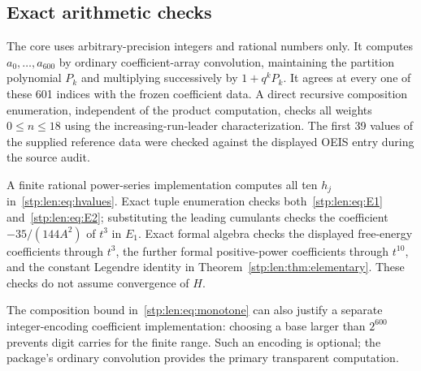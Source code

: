 \documentclass[11pt]{article}
\theoremstyle{remark}\newtheorem{remark}[theorem]{Remark}
\begin{document}
\subsection{Exact arithmetic checks}
The core uses arbitrary-precision integers and rational numbers only. It computes $a_0,\ldots,a_{600}$ by ordinary coefficient-array convolution, maintaining the partition polynomial $P_k$ and multiplying successively by $1+q^kP_k$. It agrees at every one of these 601 indices with the frozen coefficient data. A direct recursive composition enumeration, independent of the product computation, checks all weights $0\le n\le18$ using the increasing-run-leader characterization. The first 39 values of the supplied reference data were checked against the displayed OEIS entry during the source audit.

A finite rational power-series implementation computes all ten $h_j$ in~\eqref{stp:len:eq:hvalues}. Exact tuple enumeration checks both~\eqref{stp:len:eq:E1} and~\eqref{stp:len:eq:E2}; substituting the leading cumulants checks the coefficient $-35/(144A^2)$ of $t^3$ in $E_1$. Exact formal algebra checks the displayed free-energy coefficients through $t^3$, the further formal positive-power coefficients through $t^{10}$, and the constant Legendre identity in Theorem~\ref{stp:len:thm:elementary}. These checks do not assume convergence of $H$.

The composition bound in~\eqref{stp:len:eq:monotone} can also justify a separate integer-encoding coefficient implementation: choosing a base larger than $2^{600}$ prevents digit carries for the finite range. Such an encoding is optional; the package's ordinary convolution provides the primary transparent computation.
\end{document}
